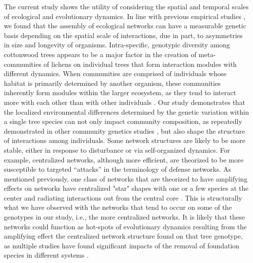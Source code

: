 \documentclass[fleqn,12pt]{olplainarticle}
\begin{document}
The current study shows the utility of considering the spatial and
temporal scales of ecological and evolutionary dynamics. In line with
previous empirical studies \citep{Bangert2006, Zook2010,
  Zytynska2012}, we found that the assembly of ecological networks can
have a measurable genetic basis depending on the spatial scale of
interactions, due in part, to asymmetries in size and longevity of
organisms.  Intra-specific, genotypic diversity among cottonwood trees
appears to be a major factor in the creation of meta-communities of
lichens on individual trees that form interaction modules with
different dynamics. When communities are comprised of individuals
whose habitat is primarily determined by another organism, these
communities inherently form modules within the larger ecosystem, as
they tend to interact more with each other than with other individuals
\citep{Lau2017a}. Our study demonstrates that the localized
environmental differences determined by the genetic variation within a
single tree species can not only impact community composition, as
repeatedly demonstrated in other community genetics studies
\citep{Whitham2006a, DesRoches2018TheVariation}, but also shape the
structure of interactions among individuals. Some network structures
are likely to be more stable, either in response to disturbance or via
self-organized dynamics. For example, centralized networks, although
more efficient, are theorized to be more susceptible to targeted
``attacks'' in the terminology of defense networks. As mentioned
previously, one class of networks that are theorized to have
amplifying effects on networks have centralized "star" shapes with one
or a few species at the center and radiating interactions out from the
central core \citep{Lieberman2005EvolutionaryGraphs}. This is
structurally what we have observed with the networks that tend to
occur on some of the genotypes in our study, i.e., the more
centralized networks. It is likely that these networks could function
as hot-spots of evolutionary dynamics resulting from the amplifying
effect the centralized network structure found on that tree genotype,
as multiple studies have found significant impacts of the removal of
foundation species in different systems \citep{Keith2017,
  DesRoches2018TheVariation}. 
\end{document}

